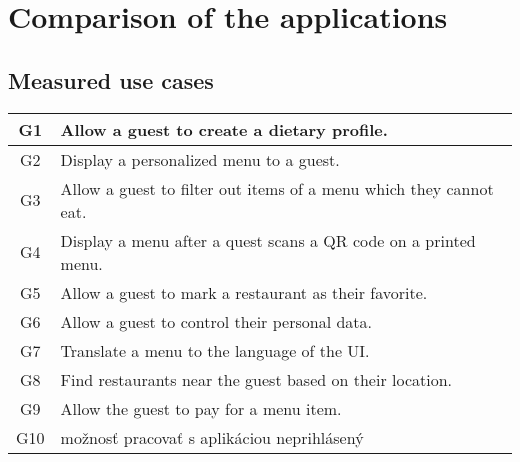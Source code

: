 \section{Comparison of the applications}

\subsection*{Measured use cases}

\begin{center}
  \begin{tabular}{| c | l |}
    \hline
    G1 & Allow a guest to create a dietary profile. \\
    \hline
    G2 & Display a personalized menu to a guest. \\
    \hline
    G3 & Allow a guest to filter out items of a menu which they cannot eat. \\
    \hline
    G4 & Display a menu after a quest scans a QR code on a printed menu. \\
    \hline
    G5 & Allow a guest to mark a restaurant as their favorite. \\
    \hline
    G6 & Allow a guest to control their personal data. \\
    \hline
    G7 & Translate a menu to the language of the UI. \\
    \hline
    G8 & Find restaurants near the guest based on their location. \\
    \hline
    G9 & Allow the guest to pay for a menu item. \\ %
    \hline
    G10 & možnosť pracovať s aplikáciou neprihlásený \\
    \hline
  \end{tabular}
  \newline
\end{center}

